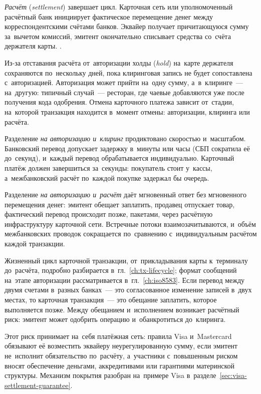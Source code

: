 \textit{Расчёт} (\textit{settlement}) завершает цикл. Карточная сеть или уполномоченный
расчётный банк инициирует фактическое перемещение денег между
корреспондентскими счётами банков. Эквайер получает причитающуюся сумму
за~вычетом комиссий, эмитент окончательно списывает средства со~счёта держателя
карты. .

Из-за отставания расчёта от~авторизации холды (\textit{hold}) на~карте
держателя сохраняются по~нескольку дней, пока
клиринговая запись не будет сопоставлена с~авторизацией. Авторизация может
прийти на~одну сумму, а~в~клиринге~--- на~другую: типичный случай~--- ресторан,
где чаевые добавляются уже после получения кода одобрения. Отмена карточного
платежа зависит от~стадии, на~которой транзакция находится в~момент отмены:
авторизации, клиринга или расчёта.

Разделение \textit{на авторизацию и~клиринг} продиктовано скоростью
и~масштабом. Банковский перевод допускает задержку в~минуты или часы (СБП
сократила её до~секунд), и~каждый перевод обрабатывается индивидуально.
Карточный платёж должен завершиться за~секунды: покупатель стоит у~кассы,
а~межбанковский расчёт по~каждой покупке задержал бы очередь.

Разделение \textit{на авторизацию и~расчёт} даёт мгновенный ответ без
мгновенного перемещения денег: эмитент обещает заплатить, продавец отпускает
товар, фактический перевод происходит позже, пакетами, через расчётную
инфраструктуру карточной сети. Встречные потоки взаимозачитываются, и~объём
межбанковских проводок сокращается по~сравнению с~индивидуальным расчётом
каждой транзакции.

Жизненный цикл карточной транзакции, от~прикладывания карты к~терминалу
до~расчёта, подробно разбирается в~гл.~\ref{ch:tx-lifecycle}; формат
сообщений на~этапе авторизации рассматривается в~гл.~\ref{ch:iso8583}. Если
перевод между двумя счетами в~разных банках~--- это согласованное изменение
записей в~двух местах, то карточная транзакция~--- это обещание заплатить,
которое выполняется позже. Между обещанием и~исполнением возникает расчётный риск: эмитент
может одобрить операцию и~обанкротиться до~клиринга.

Этот риск принимает на~себя платёжная сеть: правила Visa
и~Mastercard обязывают её возместить эквайеру неурегулированную сумму, если
эмитент не~исполнит обязательство по~расчёту, а~участники с~повышенным риском
вносят обеспечение деньгами, аккредитивами или гарантиями материнской
структуры. Механизм покрытия разобран на~примере Visa
в~разделе~\ref{sec:visa-settlement-guarantee}.

